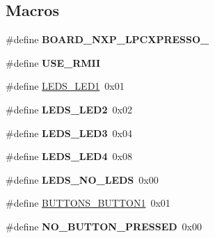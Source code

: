 \subsection*{Macros}
\begin{DoxyCompactItemize}
\item 
\hypertarget{group___b_o_a_r_d___n_x_p___l_p_c_x_p_r_e_s_s_o__1769_gaa1f7976f3b9738d46675680f2181015e}{\#define {\bfseries B\+O\+A\+R\+D\+\_\+\+N\+X\+P\+\_\+\+L\+P\+C\+X\+P\+R\+E\+S\+S\+O\+\_}}\label{group___b_o_a_r_d___n_x_p___l_p_c_x_p_r_e_s_s_o__1769_gaa1f7976f3b9738d46675680f2181015e}

\item 
\hypertarget{group___b_o_a_r_d___n_x_p___l_p_c_x_p_r_e_s_s_o__1769_ga6e00f3a80bde4bd3a03da080beca2bde}{\#define {\bfseries U\+S\+E\+\_\+\+R\+M\+I\+I}}\label{group___b_o_a_r_d___n_x_p___l_p_c_x_p_r_e_s_s_o__1769_ga6e00f3a80bde4bd3a03da080beca2bde}

\item 
\#define \hyperlink{group___b_o_a_r_d___n_x_p___l_p_c_x_p_r_e_s_s_o__1769_ga07668d0bcd1025a056db2334373709b1}{L\+E\+D\+S\+\_\+\+L\+E\+D1}~0x01
\item 
\hypertarget{group___b_o_a_r_d___n_x_p___l_p_c_x_p_r_e_s_s_o__1769_ga067978238d36887c2c33d74e69f90bce}{\#define {\bfseries L\+E\+D\+S\+\_\+\+L\+E\+D2}~0x02}\label{group___b_o_a_r_d___n_x_p___l_p_c_x_p_r_e_s_s_o__1769_ga067978238d36887c2c33d74e69f90bce}

\item 
\hypertarget{group___b_o_a_r_d___n_x_p___l_p_c_x_p_r_e_s_s_o__1769_ga5098266125f22427fe7b6bc41d6624c6}{\#define {\bfseries L\+E\+D\+S\+\_\+\+L\+E\+D3}~0x04}\label{group___b_o_a_r_d___n_x_p___l_p_c_x_p_r_e_s_s_o__1769_ga5098266125f22427fe7b6bc41d6624c6}

\item 
\hypertarget{group___b_o_a_r_d___n_x_p___l_p_c_x_p_r_e_s_s_o__1769_ga1a6ab96957b8bca4e03a9eda35798611}{\#define {\bfseries L\+E\+D\+S\+\_\+\+L\+E\+D4}~0x08}\label{group___b_o_a_r_d___n_x_p___l_p_c_x_p_r_e_s_s_o__1769_ga1a6ab96957b8bca4e03a9eda35798611}

\item 
\hypertarget{group___b_o_a_r_d___n_x_p___l_p_c_x_p_r_e_s_s_o__1769_ga66d39a43d55d7e1af4550faeaa311ef1}{\#define {\bfseries L\+E\+D\+S\+\_\+\+N\+O\+\_\+\+L\+E\+D\+S}~0x00}\label{group___b_o_a_r_d___n_x_p___l_p_c_x_p_r_e_s_s_o__1769_ga66d39a43d55d7e1af4550faeaa311ef1}

\item 
\#define \hyperlink{group___b_o_a_r_d___n_x_p___l_p_c_x_p_r_e_s_s_o__1769_ga4db3afa28c58f940cf56bf28e21ee78c}{B\+U\+T\+T\+O\+N\+S\+\_\+\+B\+U\+T\+T\+O\+N1}~0x01
\item 
\hypertarget{group___b_o_a_r_d___n_x_p___l_p_c_x_p_r_e_s_s_o__1769_gaf2d1f15dcb7bbeb2e2767ac1d6424ee1}{\#define {\bfseries N\+O\+\_\+\+B\+U\+T\+T\+O\+N\+\_\+\+P\+R\+E\+S\+S\+E\+D}~0x00}\label{group___b_o_a_r_d___n_x_p___l_p_c_x_p_r_e_s_s_o__1769_gaf2d1f15dcb7bbeb2e2767ac1d6424ee1}


\end{DoxyCompactItemize}
